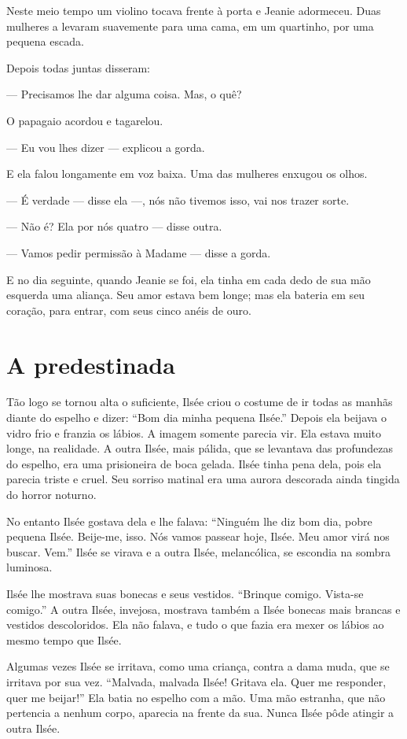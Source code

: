 Neste meio tempo um violino tocava frente à porta e Jeanie adormeceu.
Duas mulheres a levaram suavemente para uma cama, em um quartinho, por uma
pequena escada.

Depois todas juntas disseram:

--- Precisamos lhe dar alguma coisa. Mas, o quê?

O papagaio acordou e tagarelou.

--- Eu vou lhes dizer --- explicou a gorda.

E ela falou longamente em voz baixa. Uma das mulheres enxugou os olhos.

--- É verdade --- disse ela ---, nós não tivemos isso, vai nos trazer sorte.

--- Não é? Ela por nós quatro --- disse outra.

--- Vamos pedir permissão à Madame --- disse a gorda.

E no dia seguinte, quando Jeanie se foi, ela tinha em cada dedo de sua
mão esquerda uma aliança. Seu amor estava bem longe; mas ela bateria em
seu coração, para entrar, com seus cinco anéis de ouro.

\section{A predestinada}

Tão logo se tornou alta o suficiente, Ilsée criou o costume de ir todas
as manhãs diante do espelho e dizer: “Bom dia minha pequena Ilsée.” Depois
ela beijava o vidro frio e franzia os lábios. A imagem somente parecia
vir. Ela estava muito longe, na realidade. A outra Ilsée, mais pálida, que
se levantava das profundezas do espelho, era uma prisioneira de boca
gelada. Ilsée tinha pena dela, pois ela parecia triste e cruel. Seu
sorriso matinal era uma aurora descorada ainda tingida do horror noturno.

No entanto Ilsée gostava dela e lhe falava: “Ninguém lhe diz bom dia,
pobre pequena Ilsée. Beije-me, isso. Nós vamos passear hoje, Ilsée. Meu
amor virá nos buscar. Vem.” Ilsée se virava e a outra Ilsée, melancólica,
se escondia na sombra luminosa.

Ilsée lhe mostrava suas bonecas e seus vestidos. “Brinque comigo.
Vista-se comigo.” A outra Ilsée, invejosa, mostrava também a Ilsée bonecas
mais brancas e vestidos descoloridos. Ela não falava, e tudo o que fazia
era mexer os lábios ao mesmo tempo que Ilsée.

Algumas vezes Ilsée se irritava, como uma criança, contra a dama muda,
que se irritava por sua vez. “Malvada, malvada Ilsée! Gritava ela. Quer me
responder, quer me beijar!” Ela batia no espelho com a mão. Uma mão estranha, que
não pertencia a nenhum corpo, aparecia na frente da sua. Nunca Ilsée pôde
atingir a outra Ilsée.

